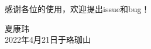 
\Acknowledgements


感谢各位的使用，欢迎提出issue和bug！

\begin{signature}
  夏康玮 \\
  2022年4月21日于珞珈山
\end{signature}